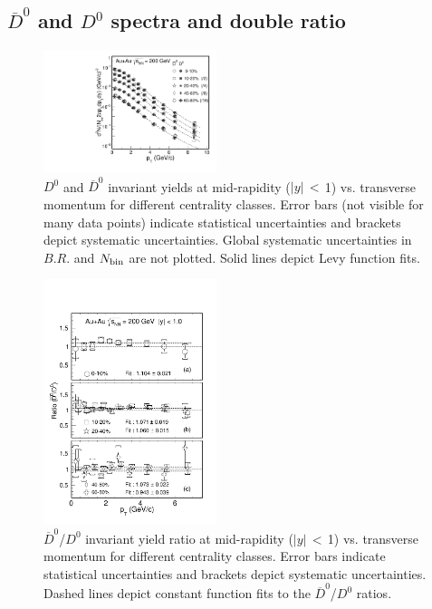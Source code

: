 \documentclass[%
 reprint,	
 amsmath,amssymb,
 aps,
 prc,
]{revtex4-1}
\begin{document}
\subsection{$\overline{D}^{0}$ and $D^{0}$ spectra and double ratio}
\label{result:D0barD0ratio} 

\begin{figure}
\centering
\includegraphics[width=0.45\textwidth]{fig/D0_spectra_bothposneg.pdf}
\caption{$D^{0}$ and $\overline{D}^{0}$ invariant yields at mid-rapidity ($|y|$\,$<$\,1) vs. transverse momentum for different centrality classes. Error bars (not visible for many data points) indicate statistical uncertainties and brackets depict systematic uncertainties. Global systematic uncertainties in $B.R.$ and $N_{\rm bin}$ are not plotted. Solid lines depict Levy function fits.}
\label{fig:D0_spectra_bothposneg} 
\end{figure}

\begin{figure}
\centering
\includegraphics[width=0.45\textwidth]{fig/D0_spectra_ratioposneg_fit.pdf}
\caption{$\overline{D}^{0}$/$D^{0}$ invariant yield ratio at mid-rapidity ($|y|$\,$<$\,1) vs. transverse momentum for different centrality classes. Error bars indicate statistical uncertainties and brackets depict systematic uncertainties. Dashed lines depict constant function fits to the $\overline{D}^{0}$/$D^{0}$ ratios.}
\label{fig:D0_spectra_ratioposneg} 
\end{figure}
\end{document}
